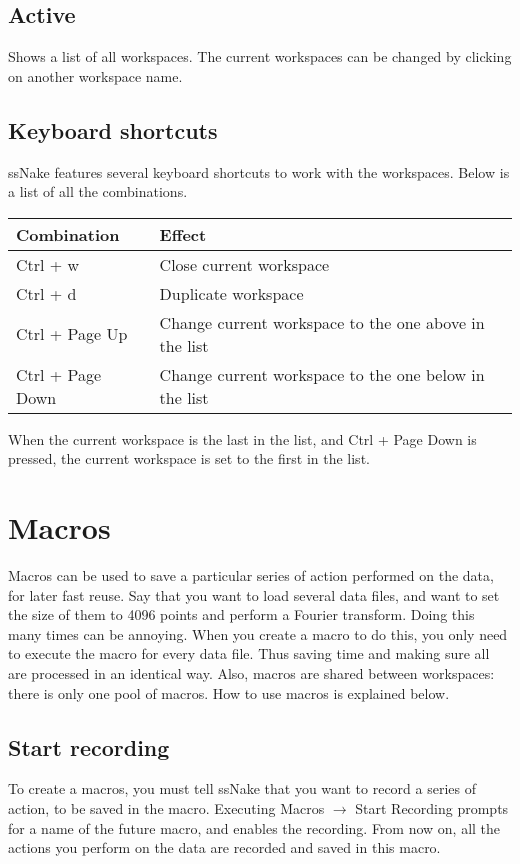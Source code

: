 \documentclass[11pt,a4paper]{article}
\begin{document}
\subsection{Active}
Shows a list of all workspaces. The current workspaces can be changed by clicking on another workspace name.

\subsection{Keyboard shortcuts}
ssNake features several keyboard shortcuts to work with the workspaces. Below is a list of all the combinations.
\begin{center}
\begin{tabular}{ll}
\toprule
Combination & Effect \\
\midrule
\rowcolor{gray!30!white}
Ctrl + w & Close current workspace\\
Ctrl + d & Duplicate workspace\\
\rowcolor{gray!30!white}
Ctrl + Page Up & Change current workspace to the one above in the list\\
Ctrl + Page Down & Change current workspace to the one below in the list\\
\bottomrule
\end{tabular}
\end{center}
When the current workspace is the last in the list, and Ctrl + Page Down is pressed, the current workspace is set to the first in the list.

\section{Macros}
Macros can be used to save a particular series of action performed on the data, for later fast reuse. Say that you want to load several data files, and want to set the size of them to 4096 points and perform a Fourier transform. Doing this many times can be annoying. When you create a macro to do this, you only need to execute the macro for every data file. Thus saving time and making sure all are processed in an identical way. Also, macros are shared between workspaces: there is only one pool of macros. How to use macros is explained below. 

\subsection{Start recording}
To create a macros, you must tell ssNake that you want to record a series of action, to be saved in the macro. Executing Macros $\rightarrow$ Start Recording prompts for a name of the future macro, and enables the recording. From now on, all the actions you perform on the data are recorded and saved in this macro.
\end{document}
